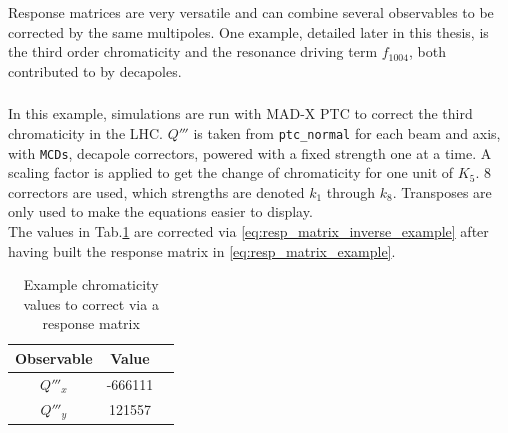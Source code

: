 Response matrices are very versatile and can combine several observables to be corrected by the same
multipoles. One example, detailed later in this thesis, is the third order chromaticity and the
resonance driving term $f_{1004}$, both contributed to by decapoles.

\subsubsection{}

In this example, simulations are run with MAD-X PTC to correct the third chromaticity in the LHC.
$Q'''$ is taken from \verb|ptc_normal| for each beam and axis, with \verb|MCDs|, decapole
correctors, powered with a fixed strength one at a time. A scaling factor is applied to get the
change of chromaticity for one unit of $K_5$.  8 correctors are used, which strengths are denoted
$k_1$ through $k_8$.  Transposes are only used to make the equations easier to display.\\
The values in Tab.\ref{table:resp_matrix_example} are corrected via
\cref{eq:resp_matrix_inverse_example} after having built the response matrix in
\cref{eq:resp_matrix_example}.

\begin{table}[H]
  \center
  \begin{tabular}{ccc}
    \toprule
      Observable & Value \\
    \midrule
      $Q'''_x$ & -666111 \\
      $Q'''_y$ &  121557 \\
    \bottomrule
  \end{tabular}
  \caption{Example chromaticity values to correct via a response matrix}
  \label{table:resp_matrix_example}
\end{table}

